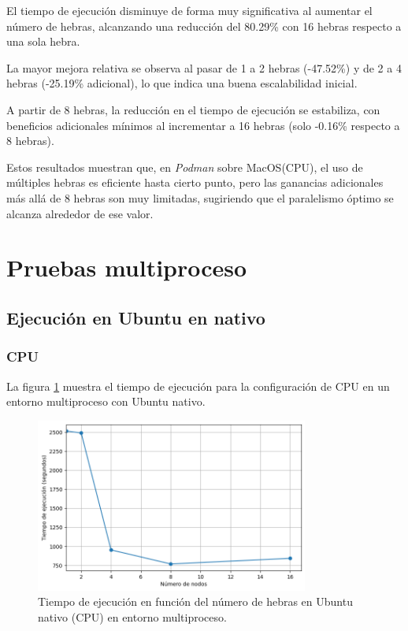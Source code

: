 El tiempo de ejecución disminuye de forma muy significativa al aumentar el número de hebras, alcanzando una reducción del 80.29\% con 16 hebras respecto a una sola hebra.

La mayor mejora relativa se observa al pasar de 1 a 2 hebras (-47.52\%) y de 2 a 4 hebras (-25.19\% adicional), lo que indica una buena escalabilidad inicial.

A partir de 8 hebras, la reducción en el tiempo de ejecución se estabiliza, con beneficios adicionales mínimos al incrementar a 16 hebras (solo -0.16\% respecto a 8 hebras).

Estos resultados muestran que, en \textit{Podman} sobre MacOS(CPU), el uso de múltiples hebras es eficiente hasta cierto punto, pero las ganancias adicionales más allá de 8 hebras son muy limitadas, sugiriendo que el paralelismo óptimo se alcanza alrededor de ese valor.

\section{Pruebas multiproceso}
\subsection{Ejecución en Ubuntu en nativo}
\subsubsection{CPU}

La figura \ref{fig:multi-node_ubuntu_cpu_native_time} muestra el tiempo de ejecución para la configuración de CPU en un entorno multiproceso con Ubuntu nativo.

\begin{figure}[ht]
    \centering
    \includegraphics[width=0.8\textwidth]{imagenes/cap5/multi-node_ubuntu_cpu_native_time.png}
    \caption{Tiempo de ejecución en función del número de hebras en Ubuntu nativo (CPU) en entorno multiproceso.}
    \label{fig:multi-node_ubuntu_cpu_native_time}
\end{figure}

